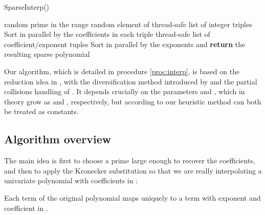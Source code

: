 \documentclass[letterpaper,10pt]{article}
\def\cite{\citep}
\begin{document}
\begin{procedure}[tb]
\caption{SparseInterp()\label{proc:interp}}

 random prime in the range  \;
 random element of  \;
 \;
 \;
 \;
 thread-safe list of integer triples \;
Sort  in parallel by the coefficients  in each triple \;
 thread-safe list of coefficient/exponent tuples \;
Sort  in parallel by the exponents and \textbf{return} the resulting sparse
polynomial
\end{procedure}

Our algorithm, which is detailed in procedure \ref{proc:interp},
is based on the reduction idea in \cite{GS09}, with the
diversification method introduced by \cite{GR11a} and the partial
collisions handling of \cite{AGR13}. It depends crucially on the
parameters  and , which in theory grow as  and
, respectively, but according to our heuristic method can both be
treated as constants.

\subsection{Algorithm overview}

The main idea is first to choose a prime  large enough to recover the
coefficients, and then to apply the Kronecker substitution so that we
are really interpolating a univariate polynomial 
with coefficients in :

Each term  of the original polynomial 
maps uniquely to a term with exponent
 and coefficient
 in .
\end{document}
